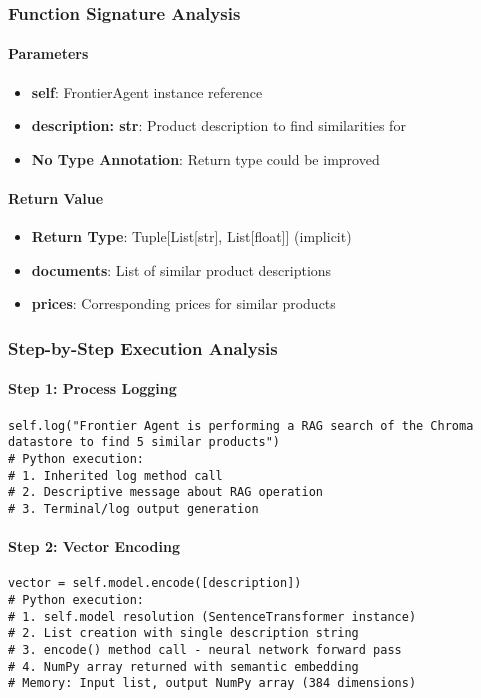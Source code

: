 \subsubsection{Function Signature Analysis}

\paragraph{Parameters}
\begin{itemize}
\item \textbf{self}: FrontierAgent instance reference
\item \textbf{description: str}: Product description to find similarities for
\item \textbf{No Type Annotation}: Return type could be improved
\end{itemize}

\paragraph{Return Value}
\begin{itemize}
\item \textbf{Return Type}: Tuple[List[str], List[float]] (implicit)
\item \textbf{documents}: List of similar product descriptions
\item \textbf{prices}: Corresponding prices for similar products
\end{itemize}

\subsubsection{Step-by-Step Execution Analysis}

\paragraph{Step 1: Process Logging}
\begin{lstlisting}[caption=RAG Process Announcement]
self.log("Frontier Agent is performing a RAG search of the Chroma datastore to find 5 similar products")
# Python execution:
# 1. Inherited log method call
# 2. Descriptive message about RAG operation
# 3. Terminal/log output generation
\end{lstlisting}

\paragraph{Step 2: Vector Encoding}
\begin{lstlisting}[caption=Text to Vector Transformation]
vector = self.model.encode([description])
# Python execution:
# 1. self.model resolution (SentenceTransformer instance)
# 2. List creation with single description string
# 3. encode() method call - neural network forward pass
# 4. NumPy array returned with semantic embedding
# Memory: Input list, output NumPy array (384 dimensions)
\end{lstlisting}


